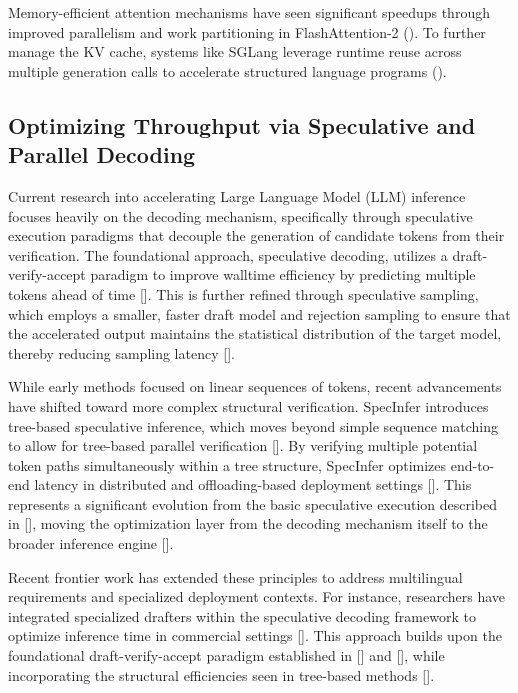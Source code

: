 \documentclass[11pt]{article}
\begin{document}
Memory-efficient attention mechanisms have seen significant speedups through improved parallelism and work partitioning in FlashAttention-2 (\citep{2307.08691}). To further manage the KV cache, systems like SGLang leverage runtime reuse across multiple generation calls to accelerate structured language programs (\citep{2312.07104}).
\subsection{Optimizing Throughput via Speculative and Parallel Decoding}

Current research into accelerating Large Language Model (LLM) inference focuses heavily on the decoding mechanism, specifically through speculative execution paradigms that decouple the generation of candidate tokens from their verification. The foundational approach, speculative decoding, utilizes a draft-verify-accept paradigm to improve walltime efficiency by predicting multiple tokens ahead of time [\citep{2211.17192}]. This is further refined through speculative sampling, which employs a smaller, faster draft model and rejection sampling to ensure that the accelerated output maintains the statistical distribution of the target model, thereby reducing sampling latency [\citep{2302.01318}].

While early methods focused on linear sequences of tokens, recent advancements have shifted toward more complex structural verification. SpecInfer introduces tree-based speculative inference, which moves beyond simple sequence matching to allow for tree-based parallel verification [\citep{2305.09781}]. By verifying multiple potential token paths simultaneously within a tree structure, SpecInfer optimizes end-to-end latency in distributed and offloading-based deployment settings [\citep{2305.09781}]. This represents a significant evolution from the basic speculative execution described in [\citep{2211.17192}], moving the optimization layer from the decoding mechanism itself to the broader inference engine [\citep{2305.09781}].

Recent frontier work has extended these principles to address multilingual requirements and specialized deployment contexts. For instance, researchers have integrated specialized drafters within the speculative decoding framework to optimize inference time in commercial settings [\citep{2406.16758}]. This approach builds upon the foundational draft-verify-accept paradigm established in [\citep{2211.17192}] and [\citep{2302.01318}], while incorporating the structural efficiencies seen in tree-based methods [\citep{2406.16758}].
\end{document}

